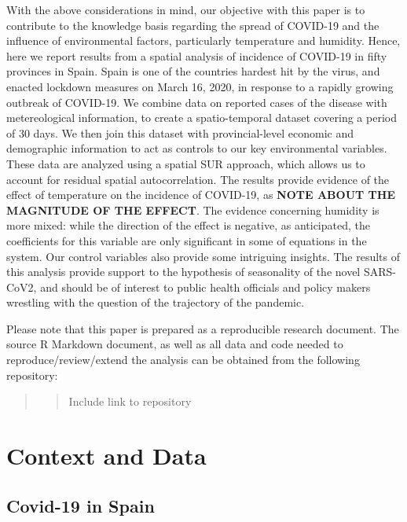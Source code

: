 \documentclass[]{elsarticle} %
\begin{document}
With the above considerations in mind, our objective with this paper is
to contribute to the knowledge basis regarding the spread of COVID-19
and the influence of environmental factors, particularly temperature and
humidity. Hence, here we report results from a spatial analysis of
incidence of COVID-19 in fifty provinces in Spain. Spain is one of the
countries hardest hit by the virus, and enacted lockdown measures on
March 16, 2020, in response to a rapidly growing outbreak of COVID-19.
We combine data on reported cases of the disease with metereological
information, to create a spatio-temporal dataset covering a period of 30
days. We then join this dataset with provincial-level economic and
demographic information to act as controls to our key environmental
variables. These data are analyzed using a spatial SUR approach, which
allows us to account for residual spatial autocorrelation. The results
provide evidence of the effect of temperature on the incidence of
COVID-19, as \textbf{NOTE ABOUT THE MAGNITUDE OF THE EFFECT}. The
evidence concerning humidity is more mixed: while the direction of the
effect is negative, as anticipated, the coefficients for this variable
are only significant in some of equations in the system. Our control
variables also provide some intriguing insights. The results of this
analysis provide support to the hypothesis of seasonality of the novel
SARS-CoV2, and should be of interest to public health officials and
policy makers wrestling with the question of the trajectory of the
pandemic.

Please note that this paper is prepared as a reproducible research
document. The source R Markdown document, as well as all data and code
needed to reproduce/review/extend the analysis can be obtained from the
following repository:

\begin{quote}
\begin{quote}
Include link to repository
\end{quote}
\end{quote}

\hypertarget{context-and-data}{%
\section{Context and Data}\label{context-and-data}}

\hypertarget{covid-19-in-spain}{%
\subsection{Covid-19 in Spain}\label{covid-19-in-spain}}
\end{document}
